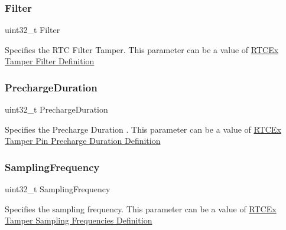 \subsubsection{\texorpdfstring{Filter}{Filter}}
{\footnotesize\ttfamily uint32\+\_\+t Filter}

Specifies the R\+TC Filter Tamper. This parameter can be a value of \hyperlink{group___r_t_c_ex___tamper___filter___definitions}{R\+T\+C\+Ex Tamper Filter Definition} \mbox{\label{struct_r_t_c___tamper_type_def_a6fbac45841d9d2d878199a440449a416}} 
\subsubsection{\texorpdfstring{Precharge\+Duration}{PrechargeDuration}}
{\footnotesize\ttfamily uint32\+\_\+t Precharge\+Duration}

Specifies the Precharge Duration . This parameter can be a value of \hyperlink{group___r_t_c_ex___tamper___pin___precharge___duration___definitions}{R\+T\+C\+Ex Tamper Pin Precharge Duration Definition} \mbox{\label{struct_r_t_c___tamper_type_def_a632dccc8dfc8dd442591ca34a95cc69d}} 
\subsubsection{\texorpdfstring{Sampling\+Frequency}{SamplingFrequency}}
{\footnotesize\ttfamily uint32\+\_\+t Sampling\+Frequency}

Specifies the sampling frequency. This parameter can be a value of \hyperlink{group___r_t_c_ex___tamper___sampling___frequencies___definitions}{R\+T\+C\+Ex Tamper Sampling Frequencies Definition} \mbox{\label{struct_r_t_c___tamper_type_def_a171f3c1ad5ac278d7d5bde4f40e0728b}} 
